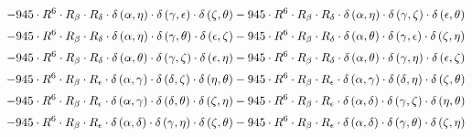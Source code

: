 \begin{subequations}
\begin{gather}
 \\[0.2em] \notag 		 - 945 \cdot R^{6} \cdot R_{\beta{}} \cdot R_{\delta{}} \cdot \delta{}\left(\alpha{}, \eta{}\right) \cdot \delta{}\left(\gamma{}, \epsilon{}\right) \cdot \delta{}\left(\zeta{}, \theta{}\right)- 945 \cdot R^{6} \cdot R_{\beta{}} \cdot R_{\delta{}} \cdot \delta{}\left(\alpha{}, \eta{}\right) \cdot \delta{}\left(\gamma{}, \zeta{}\right) \cdot \delta{}\left(\epsilon{}, \theta{}\right) 
 \\[0.2em] \notag 		 - 945 \cdot R^{6} \cdot R_{\beta{}} \cdot R_{\delta{}} \cdot \delta{}\left(\alpha{}, \eta{}\right) \cdot \delta{}\left(\gamma{}, \theta{}\right) \cdot \delta{}\left(\epsilon{}, \zeta{}\right)- 945 \cdot R^{6} \cdot R_{\beta{}} \cdot R_{\delta{}} \cdot \delta{}\left(\alpha{}, \theta{}\right) \cdot \delta{}\left(\gamma{}, \epsilon{}\right) \cdot \delta{}\left(\zeta{}, \eta{}\right) 
 \\[0.2em] \notag 		 - 945 \cdot R^{6} \cdot R_{\beta{}} \cdot R_{\delta{}} \cdot \delta{}\left(\alpha{}, \theta{}\right) \cdot \delta{}\left(\gamma{}, \zeta{}\right) \cdot \delta{}\left(\epsilon{}, \eta{}\right)- 945 \cdot R^{6} \cdot R_{\beta{}} \cdot R_{\delta{}} \cdot \delta{}\left(\alpha{}, \theta{}\right) \cdot \delta{}\left(\gamma{}, \eta{}\right) \cdot \delta{}\left(\epsilon{}, \zeta{}\right) 
 \\[0.2em] \notag 		 - 945 \cdot R^{6} \cdot R_{\beta{}} \cdot R_{\epsilon{}} \cdot \delta{}\left(\alpha{}, \gamma{}\right) \cdot \delta{}\left(\delta{}, \zeta{}\right) \cdot \delta{}\left(\eta{}, \theta{}\right)- 945 \cdot R^{6} \cdot R_{\beta{}} \cdot R_{\epsilon{}} \cdot \delta{}\left(\alpha{}, \gamma{}\right) \cdot \delta{}\left(\delta{}, \eta{}\right) \cdot \delta{}\left(\zeta{}, \theta{}\right) 
 \\[0.2em] \notag 		 - 945 \cdot R^{6} \cdot R_{\beta{}} \cdot R_{\epsilon{}} \cdot \delta{}\left(\alpha{}, \gamma{}\right) \cdot \delta{}\left(\delta{}, \theta{}\right) \cdot \delta{}\left(\zeta{}, \eta{}\right)- 945 \cdot R^{6} \cdot R_{\beta{}} \cdot R_{\epsilon{}} \cdot \delta{}\left(\alpha{}, \delta{}\right) \cdot \delta{}\left(\gamma{}, \zeta{}\right) \cdot \delta{}\left(\eta{}, \theta{}\right) 
 \\[0.2em] \notag 		 - 945 \cdot R^{6} \cdot R_{\beta{}} \cdot R_{\epsilon{}} \cdot \delta{}\left(\alpha{}, \delta{}\right) \cdot \delta{}\left(\gamma{}, \eta{}\right) \cdot \delta{}\left(\zeta{}, \theta{}\right)- 945 \cdot R^{6} \cdot R_{\beta{}} \cdot R_{\epsilon{}} \cdot \delta{}\left(\alpha{}, \delta{}\right) \cdot \delta{}\left(\gamma{}, \theta{}\right) \cdot \delta{}\left(\zeta{}, \eta{}\right) 

\end{gather}
\end{subequations}

